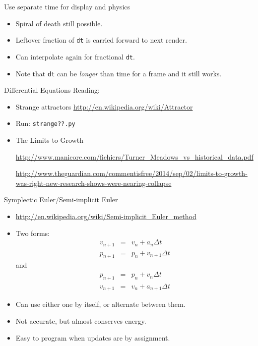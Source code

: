 \documentclass[handout,t,compress]{beamer}
\newcommand{\bframe}[1]{\begin{frame}[fragile]{#1}}
\begin{document}
\bframe{Use separate time for display and physics}
\begin{itemize}
  \begin{Verbatim}[frame=single]
framerate = 30.0
rendertime, physicstime = 0.0, 0.0
dt = 0.01
while !quitting:
  rendertime += clock.tick(framerate) * 0.001
  handle.input()
  while (physicstime < rendertime):
    integrate(state, physicstime, dt)
    physicstime += dt
  display()
\end{Verbatim}
\item Spiral of death still possible.
  \item Leftover fraction of {\tt dt} is carried forward to next
    render. 
  \item Can interpolate again for fractional {\tt dt}.
\item Note that {\tt dt} can be {\em longer} than time for a frame and it still
  works.
\end{itemize}
\end{frame}


\bframe{Differential Equations}
Reading:
\begin{itemize}
\item Strange attractors
\url{http://en.wikipedia.org/wiki/Attractor}

\item Run: {\tt strange??.py}

\item The Limits to Growth

{
\tiny

\setlength{\parindent}{-1cm}

\url{http://www.manicore.com/fichiers/Turner_Meadows_vs_historical_data.pdf}


\url{http://www.theguardian.com/commentisfree/2014/sep/02/limits-to-growth-was-right-new-research-shows-were-nearing-collapse}


}

\end{itemize}
\end{frame}

\bframe{Symplectic Euler/Semi-implicit Euler}
\begin{itemize}
\item \url{http://en.wikipedia.org/wiki/Semi-implicit_Euler_method}
\item Two forms:
\begin{eqnarray*}
v_{n+1} &=& v_{n} + a_{n}\Delta t\\
p_{n+1} &=& p_{n} + v_{n+1}\Delta t
\end{eqnarray*}
and
\begin{eqnarray*}
p_{n+1} &=& p_{n} + v_{n}\Delta t\\
v_{n+1} &=& v_{n} + a_{n+1}\Delta t
\end{eqnarray*}
\item Can use either one by itself, or alternate between them.
\item Not accurate, but almost conserves energy.
\item Easy to program when updates are by assignment.
\end{itemize}
\end{frame}
\end{document}
